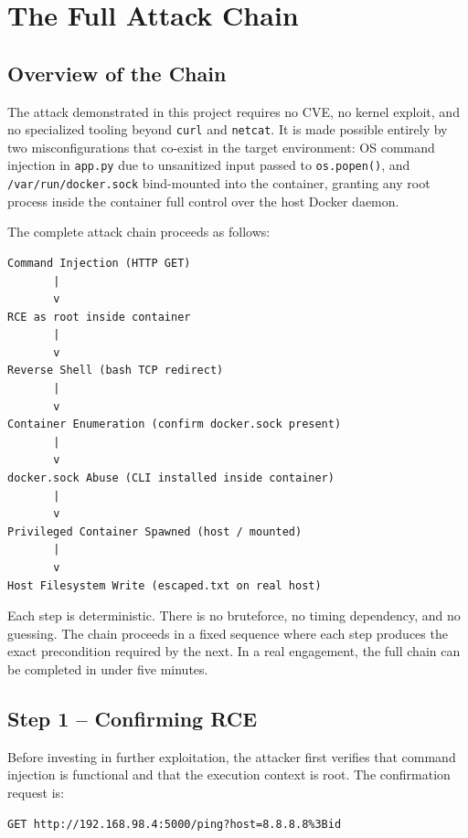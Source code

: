 \chapter{The Full Attack Chain}

\section{Overview of the Chain}

The attack demonstrated in this project requires no CVE, no kernel exploit, and no specialized tooling beyond \texttt{curl} and \texttt{netcat}. It is made possible entirely by two misconfigurations that co-exist in the target environment: OS command injection in \texttt{app.py} due to unsanitized input passed to \texttt{os.popen()}, and \texttt{/var/run/docker.sock} bind-mounted into the container, granting any root process inside the container full control over the host Docker daemon.

The complete attack chain proceeds as follows:

\begin{lstlisting}
Command Injection (HTTP GET)
       |
       v
RCE as root inside container
       |
       v
Reverse Shell (bash TCP redirect)
       |
       v
Container Enumeration (confirm docker.sock present)
       |
       v
docker.sock Abuse (CLI installed inside container)
       |
       v
Privileged Container Spawned (host / mounted)
       |
       v
Host Filesystem Write (escaped.txt on real host)
\end{lstlisting}

Each step is deterministic. There is no bruteforce, no timing dependency, and no guessing. The chain proceeds in a fixed sequence where each step produces the exact precondition required by the next. In a real engagement, the full chain can be completed in under five minutes.

\vspace{0.3cm}

\section{Step 1 -- Confirming RCE}

Before investing in further exploitation, the attacker first verifies that command injection is functional and that the execution context is root. The confirmation request is:

\begin{lstlisting}
GET http://192.168.98.4:5000/ping?host=8.8.8.8%3Bid
\end{lstlisting}


